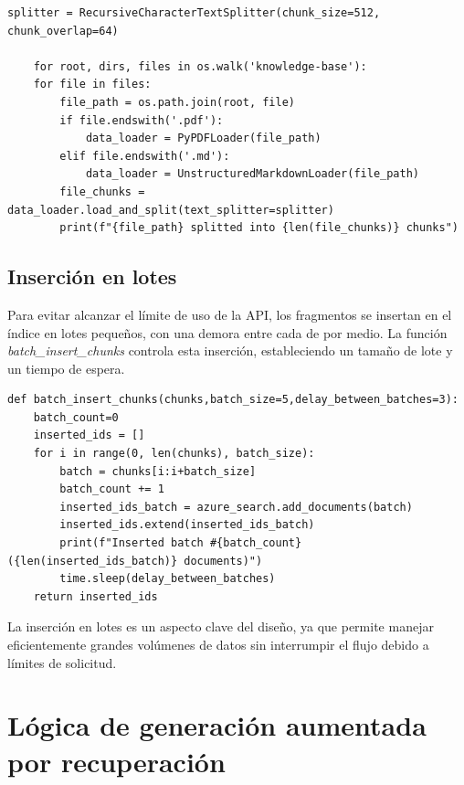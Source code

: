 \begin{lstlisting}[label=cod:update-db-5,caption=Divisor de texto.]
	splitter = RecursiveCharacterTextSplitter(chunk_size=512, chunk_overlap=64)

	for root, dirs, files in os.walk('knowledge-base'):
    for file in files:
        file_path = os.path.join(root, file)
        if file.endswith('.pdf'):
            data_loader = PyPDFLoader(file_path)
        elif file.endswith('.md'):
            data_loader = UnstructuredMarkdownLoader(file_path)
        file_chunks = data_loader.load_and_split(text_splitter=splitter)
        print(f"{file_path} splitted into {len(file_chunks)} chunks")
\end{lstlisting}

\subsection{Inserción en lotes}

Para evitar alcanzar el límite de uso de la API, los fragmentos se insertan en el índice en lotes pequeños, con una demora entre cada de por medio. 
La función \textit{batch\_insert\_chunks} controla esta inserción, estableciendo un tamaño de lote y un tiempo de espera.

\begin{lstlisting}[label=cod:update-db-6,caption=Inserción en lotes.]
	def batch_insert_chunks(chunks,batch_size=5,delay_between_batches=3):
    batch_count=0
    inserted_ids = []
    for i in range(0, len(chunks), batch_size):
        batch = chunks[i:i+batch_size]
        batch_count += 1
        inserted_ids_batch = azure_search.add_documents(batch)
        inserted_ids.extend(inserted_ids_batch)
        print(f"Inserted batch #{batch_count} ({len(inserted_ids_batch)} documents)")
        time.sleep(delay_between_batches)
    return inserted_ids
\end{lstlisting}

La inserción en lotes es un aspecto clave del diseño, ya que permite manejar eficientemente grandes volúmenes de datos sin interrumpir
el flujo debido a límites de solicitud.

\vspace{8mm}

\section{Lógica de generación aumentada por recuperación}

